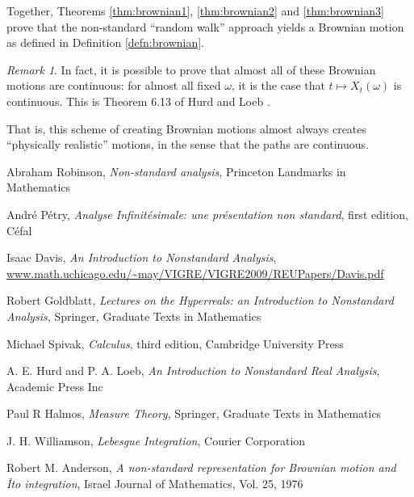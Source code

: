 \documentclass[11pt]{amsart}
\theoremstyle{remark}
\newtheorem*{remark}{Remark}
\begin{document}
Together, Theorems \ref{thm:brownian1}, \ref{thm:brownian2} and \ref{thm:brownian3} prove that the non-standard ``random walk'' approach yields a Brownian motion as defined in Definition \ref{defn:brownian}.

\begin{remark}
In fact, it is possible to prove that almost all of these Brownian motions are continuous: for almost all fixed $\omega$, it is the case that $t \mapsto X_t(\omega)$ is continuous.
This is Theorem 6.13 of Hurd and Loeb \cite{hurdloeb}.

That is, this scheme of creating Brownian motions almost always creates ``physically realistic'' motions, in the sense that the paths are continuous.
\end{remark}

\begin{thebibliography}{9}

 Abraham Robinson,
 \emph{Non-standard analysis},
 Princeton Landmarks in Mathematics
 
  Andr\'{e} P\'{e}try,
  \emph{Analyse Infinit\'{e}simale: une pr\'{e}sentation non standard}, first edition,
  C\'{e}fal

  Isaac Davis,
  \emph{An Introduction to Nonstandard Analysis}, \\
  \url{www.math.uchicago.edu/~may/VIGRE/VIGRE2009/REUPapers/Davis.pdf}

  Robert Goldblatt,
  \emph{Lectures on the Hyperreals: an Introduction to Nonstandard Analysis},
  Springer, Graduate Texts in Mathematics

  Michael Spivak,
  \emph{Calculus}, third edition,
  Cambridge University Press
  
  A. E. Hurd and P. A. Loeb,
  \emph{An Introduction to Nonstandard Real Analysis},
  Academic Press Inc
  
  Paul R Halmos,
  \emph{Measure Theory},
  Springer, Graduate Texts in Mathematics
  
  J. H. Williamson,
  \emph{Lebesgue Integration},
  Courier Corporation
  
  Robert M. Anderson,
  \emph{A non-standard representation for Brownian motion and \^Ito integration},
  Israel Journal of Mathematics, Vol. 25, 1976

\end{thebibliography}
\end{document}
